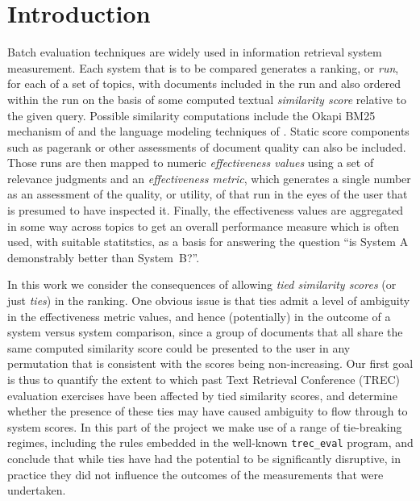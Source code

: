 \section{Introduction}
\label{sec-intro}

Batch evaluation techniques are widely used in information retrieval
system measurement.
Each system that is to be compared generates a ranking, or
{\emph{run}}, for each of a set of topics, with documents included in
the run and also ordered within the run on the basis of some computed
textual {\emph{similarity score}} relative to the given query.
Possible similarity computations include the Okapi BM25 mechanism of
{\citet{rwjhg94trec}} and the language modeling techniques of
{\citet{pc98sigir}}.
Static score components such as pagerank or other assessments of
document quality can also be included.
Those runs are then mapped to numeric {\emph{effectiveness values}}
using a set of relevance judgments and an {\emph{effectiveness
metric}}, which generates a single number as an assessment of the
quality, or utility, of that run in the eyes of the user that is
presumed to have inspected it.
Finally, the effectiveness values are aggregated in some way across
topics to get an overall performance measure which is often used, with suitable statitstics,
as a basis for answering the question
``is System A demonstrably better than System~B?''.

In this work we consider the consequences of allowing {\emph{tied
similarity scores}} (or just {\emph{ties}}) in the ranking.
One obvious issue is that ties admit a level of ambiguity in the
effectiveness metric values, and hence (potentially) in the outcome of a
system versus system comparison, since a group of documents that all
share the same computed similarity score could be presented to the
user in any permutation that is consistent with the scores being
non-increasing.
Our first goal is thus to quantify the extent to which past Text
Retrieval Conference (TREC) evaluation exercises have been affected
by tied similarity scores, and determine whether the presence of these 
ties may have caused
ambiguity to flow through to system scores.
In this part of the project we make use of a range of tie-breaking
regimes, including the rules embedded in the well-known
{\tt{trec\_eval}} program, and conclude that while ties have had the
potential to be significantly disruptive, in practice they did not
influence the outcomes of the measurements that were undertaken.

